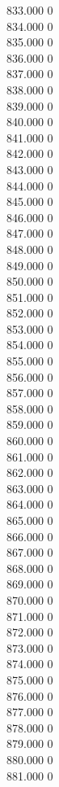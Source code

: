 { 833.000	0 \\
 834.000	0 \\
 835.000	0 \\
 836.000	0 \\
 837.000	0 \\
 838.000	0 \\
 839.000	0 \\
 840.000	0 \\
 841.000	0 \\
 842.000	0 \\
 843.000	0 \\
 844.000	0 \\
 845.000	0 \\
 846.000	0 \\
 847.000	0 \\
 848.000	0 \\
 849.000	0 \\
 850.000	0 \\
 851.000	0 \\
 852.000	0 \\
 853.000	0 \\
 854.000	0 \\
 855.000	0 \\
 856.000	0 \\
 857.000	0 \\
 858.000	0 \\
 859.000	0 \\
 860.000	0 \\
 861.000	0 \\
 862.000	0 \\
 863.000	0 \\
 864.000	0 \\
 865.000	0 \\
 866.000	0 \\
 867.000	0 \\
 868.000	0 \\
 869.000	0 \\
 870.000	0 \\
 871.000	0 \\
 872.000	0 \\
 873.000	0 \\
 874.000	0 \\
 875.000	0 \\
 876.000	0 \\
 877.000	0 \\
 878.000	0 \\
 879.000	0 \\
 880.000	0 \\
 881.000	0 \\
}
